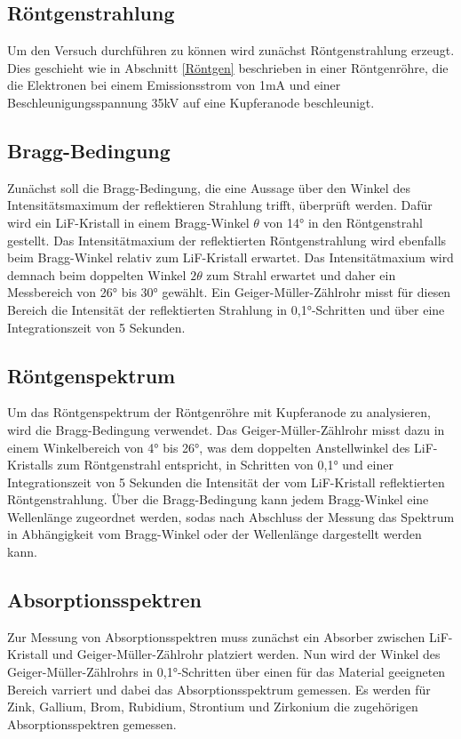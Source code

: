 \documentclass[titlepage = firstcover]{scrartcl}
\begin{document}
    \FloatBarrier

            
        \subsection{Röntgenstrahlung}
          Um den Versuch durchführen zu können wird zunächst Röntgenstrahlung erzeugt. Dies geschieht wie in Abschnitt \ref{Röntgen} beschrieben in einer Röntgenröhre, die die Elektronen bei einem Emissionsstrom
          von 1mA und einer Beschleunigungsspannung 35kV auf eine Kupferanode beschleunigt. 

        \subsection{Bragg-Bedingung}
          Zunächst soll die Bragg-Bedingung, die eine Aussage über den Winkel des Intensitätsmaximum der reflektieren Strahlung trifft, überprüft werden. Dafür wird ein LiF-Kristall in einem 
          Bragg-Winkel $\theta$ von 14° in den Röntgenstrahl gestellt. Das Intensitätmaxium der reflektierten Röntgenstrahlung wird ebenfalls beim Bragg-Winkel relativ zum LiF-Kristall erwartet. 
          Das Intensitätmaxium wird demnach beim doppelten Winkel $2\theta$ zum Strahl erwartet und daher ein Messbereich von 26° bis 30° gewählt. Ein Geiger-Müller-Zählrohr misst
          für diesen Bereich die Intensität der reflektierten Strahlung in 0,1°-Schritten und über eine Integrationszeit von 5 Sekunden.

        \subsection{Röntgenspektrum}
          Um das Röntgenspektrum der Röntgenröhre mit Kupferanode zu analysieren, wird die Bragg-Bedingung verwendet. Das Geiger-Müller-Zählrohr misst dazu in einem Winkelbereich von 4° bis 26°, was
          dem doppelten Anstellwinkel des LiF-Kristalls zum Röntgenstrahl entspricht, in Schritten von 0,1° und einer Integrationszeit von 5 Sekunden die Intensität der vom LiF-Kristall reflektierten 
          Röntgenstrahlung. Über die Bragg-Bedingung kann jedem Bragg-Winkel eine Wellenlänge zugeordnet werden, sodas nach Abschluss der Messung das Spektrum in Abhängigkeit vom Bragg-Winkel oder der
          Wellenlänge dargestellt werden kann.


        \subsection{Absorptionsspektren}
          Zur Messung von Absorptionsspektren muss zunächst ein Absorber zwischen LiF-Kristall und Geiger-Müller-Zählrohr platziert werden. Nun wird der Winkel des Geiger-Müller-Zählrohrs in 
          0,1°-Schritten über einen für das Material geeigneten Bereich varriert und dabei das Absorptionsspektrum gemessen. Es werden für Zink, Gallium, Brom, Rubidium, Strontium und Zirkonium
          die zugehörigen Absorptionsspektren gemessen.
          
\end{document}

